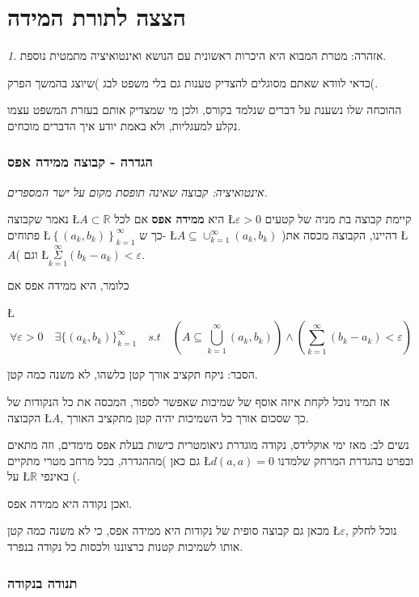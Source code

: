 \documentclass[english,hebrew]{article}
\theoremstyle{remark}
\newtheorem*{rem*}{\protect\remarkname}
\theoremstyle{definition}
\theoremstyle{plain}
\theoremstyle{remark}
\theoremstyle{plain}
\theoremstyle{plain}
\theoremstyle{definition}
\theoremstyle{plain}
\providecommand{\remarkname}{הערה}
\begin{document}
\part{הצצה לתורת המידה}
\begin{rem*}
אזהרה: מטרת המבוא היא היכרות ראשונית עם הנושא ואינטואיציה מתמטית נוספת.

כדאי לוודא שאתם מסוגלים להצדיק טענות גם בלי משפט לבג )שיוצג בהמשך
הפרק(.

ההוכחה שלו נשענת על דברים שנלמד בקורס, ולכן מי שמצדיק אותם בעזרת המשפט
עצמו נקלע למעגליות, ולא באמת יודע איך הדברים מוכחים.
\end{rem*}

\section{הגדרה - קבוצה ממידה אפס}

\emph{אינטואיציה: קבוצה שאינה תופסת מקום על ישר המספרים.}

נאמר שקבוצה \L{$A\subset\mathbb{R}$} היא \textbf{ממידה אפס} אם לכל
\L{$\varepsilon>0$} קיימת קבוצה בת מניה של קטעים פתוחים \L{$\left\{ \left(a_{k},b_{k}\right)\right\} _{k=1}^{\infty}$}
כך ש- \L{$A\subseteq\cup_{k=1}^{\infty}\left(a_{k},b_{k}\right)$}
)דהיינו, הקבוצה מכסה את \L{$A$}( וגם \L{$\underset{k=1}{\overset{\infty}{\Sigma}}\left(b_{k}-a_{k}\right)<\varepsilon$}.

כלומר, היא ממידה אפס אם

\L{%
\[
\forall\varepsilon>0\quad\exists\{(a_{k},b_{k})\}_{k=1}^{\infty}\quad s.t\quad\left(A\subseteq\bigcup_{k=1}^{\infty}(a_{k},b_{k})\right)\land\left(\sum_{k=1}^{\infty}(b_{k}-a_{k})<\varepsilon\right)
\]
}%

הסבר: ניקח תקציב אורך קטן כלשהו, לא משנה כמה קטן.

אז תמיד נוכל לקחת איזה אוסף של שמיכות שאפשר לספור, המכסה את כל הנקודות
של הקבוצה \L{$A$}, כך שסכום אורך כל השמיכות יהיה קטן מתקציב האורך.

נשים לב: מאז ימי אוקלידס, נקודה מוגדרת גיאומטרית כישות בעלת אפס מימדים,
וזה מתאים גם כאן )מההגדרה, בכל מרחב מטרי מתקיים \L{$d\left(a,a\right)=0$}
ובפרט בהגדרת המרחק שלמדנו על \L{$\mathbb{R}$} באינפי {\endL}(.

ואכן נקודה היא ממידה אפס.

מכאן גם קבוצה סופית של נקודות היא ממידה אפס, כי לא משנה כמה קטן \L{$\varepsilon$},
נוכל לחלק אותו לשמיכות קטנות כרצוננו ולכסות כל נקודה בנפרד.

\section{תנודה בנקודה}
\end{document}
